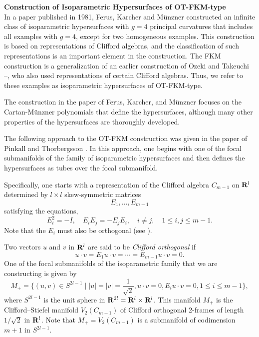 \documentclass[12pt]{article}
\begin{document}
\noindent
{\bf Construction of Isoparametric Hypersurfaces of OT-FKM-type}\\

In a paper published in 1981, Ferus, Karcher and M\"{u}nzner
\cite{FKM} constructed an infinite class of 
isoparametric hypersurfaces with $g=4$ principal curvatures that includes all examples with $g=4$, except
for two homogeneous examples.
This construction is based on representations
of Clifford algebras, and the classification of such representations is an important element in the construction.
The FKM construction is a generalization of an earlier construction of Ozeki and Takeuchi
\cite{OT}--\cite{OT2}, who also used representations of certain Clifford algebras.  Thus, we refer to these examples as isoparametric hypersurfaces of OT-FKM-type.


The construction in the paper of 
Ferus, Karcher, and M\"{u}nzner \cite{FKM} focuses on the Cartan-M\"{u}nzner  polynomials that define the hypersurfaces,
although many other properties of the hypersurfaces are thoroughly developed.  

The following approach to the OT-FKM construction was given in the paper of Pinkall and Thorbergsson \cite{PT1}.  In this approach, one begins with one of the focal submanifolds of the family of isoparametric hypersurfaces and then defines the hypersurfaces as tubes over the focal submanifold.

Specifically, one
starts with a representation of the Clifford algebra 
$C_{m-1}$ on ${\bf R}^l$ determined by $l \times l$ skew-symmetric matrices
\begin{displaymath} 
E_1,\ldots,E_{m-1}
\end{displaymath}
satisfying the equations,
\begin{equation} 
\label{eq:3.7.1}
E_i^2 = -I, \quad E_i E_j = - E_j E_i, \quad i \neq j, \quad 1 \leq i,j \leq m-1.
\end{equation}
Note that the $E_i$ must also be orthogonal (see  \cite[p. 98]{Cec1}).

Two vectors $u$ and $v$ in ${\bf R}^l$ are said to be 
{\em Clifford orthogonal} if
\begin{equation} 
\label{eq:3.7.2}
u \cdot v = E_1 u \cdot v = \cdots = E_{m-1} u \cdot v = 0.
\end{equation}
One of the focal submanifolds of the isoparametric family that we are constructing  is given by
\begin{equation} 
\label{eq:3.7.3}
M_{+} = \{(u,v) \in S^{2l-1} \mid |u|= |v| = \frac{1}{\sqrt{2}}, u \cdot v = 0, E_i u \cdot v = 0, 1 \leq i \leq m-1 \},
\end{equation}
where $S^{2l-1}$ is the unit sphere in ${\bf R}^{2l} = {\bf R}^l \times {\bf R}^l$.
This manifold $M_{+}$ is the Clifford--Stiefel
manifold $V_2 (C_{m-1})$ of Clifford orthogonal 2-frames of length
$1/\sqrt{2}$ in ${\bf R}^l$.  Note that $M_{+} = V_2 (C_{m-1})$ is a submanifold of codimension $m+1$ in $S^{2l-1}$.
\end{document}
